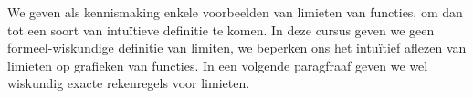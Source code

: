 \documentclass[numbers]{ximera}
\begin{document}
We geven als kennismaking enkele voorbeelden van limieten van functies, om dan tot een soort van intuïtieve definitie te komen. In  deze cursus geven we geen formeel-wiskundige definitie van limiten, we beperken ons het intuïtief aflezen van limieten op grafieken van functies. In een volgende paragfraaf geven we wel wiskundig exacte rekenregels voor limieten.

%
\end{document}
